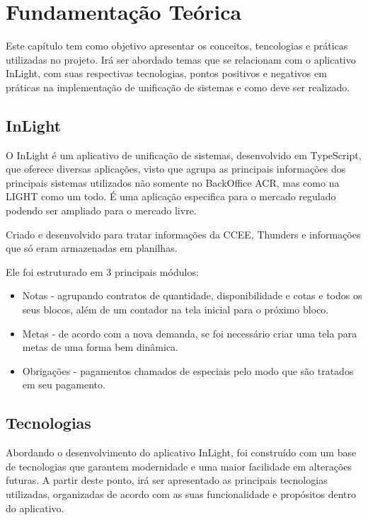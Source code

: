 \chapter{Fundamentação Teórica}
\label{sec:fundamentacao}

Este capítulo tem como objetivo apresentar os conceitos, tencologias e práticas utilizadas no projeto. Irá ser abordado temas que se relacionam com o aplicativo InLight, com suas respectivas tecnologias, pontos positivos e negativos em práticas na implementação de unificação de sistemas e como deve ser realizado.

\section{InLight}

O InLight é um aplicativo de unificação de sistemas, desenvolvido em TypeScript, que oferece diversas aplicações, visto que agrupa as principais informações dos principais sistemas utilizados não somente  no BackOffice ACR, mas como na LIGHT como um todo. É uma aplicação especifica para o mercado regulado podendo ser ampliado para o mercado livre.

Criado e desenvolvido para tratar informações da CCEE, Thunders e informações que só eram armazenadas em planilhas.

Ele foi estruturado em 3 principais módulos:

\begin{itemize}
    \item Notas - agrupando contratos de quantidade, disponibilidade e cotas e todos os seus blocos, além de um contador na tela inicial para o próximo bloco.
    \item Metas - de acordo com a nova demanda, se foi necessário criar uma tela para metas de uma forma bem dinâmica.
    \item Obrigações - pagamentos chamados de especiais pelo modo que são tratados em seu pagamento.
\end{itemize}

\section{Tecnologias}
Abordando o desenvolvimento do aplicativo InLight, foi construído com um base de tecnologias que garantem modernidade e uma maior facilidade em alterações futuras. A partir deste ponto, irá ser apresentado as principais tecnologias utilizadas, organizadas de acordo com as suas funcionalidade e propósitos dentro do aplicativo.

